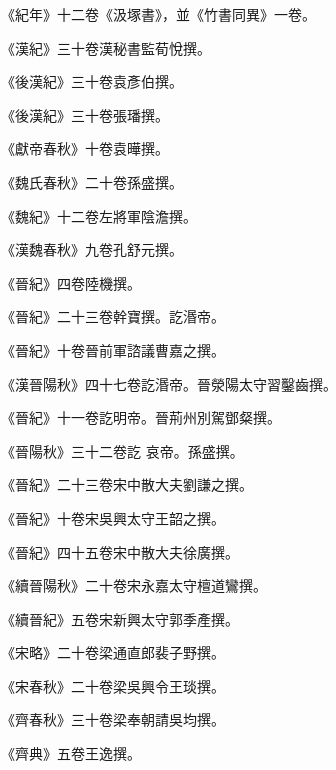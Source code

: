 \begin{pinyinscope}
 《紀年》十二卷《汲塚書》，並《竹書同異》一卷。



 《漢紀》三十卷漢秘書監荀悅撰。



 《後漢紀》三十卷袁彥伯撰。



 《後漢紀》三十卷張璠撰。



 《獻帝春秋》十卷袁曄撰。



 《魏氏春秋》二十卷孫盛撰。



 《魏紀》十二卷左將軍陰澹撰。



 《漢魏春秋》九卷孔舒元撰。



 《晉紀》四卷陸機撰。



 《晉紀》二十三卷幹寶撰。訖湣帝。



 《晉紀》十卷晉前軍諮議曹嘉之撰。



 《漢晉陽秋》四十七卷訖湣帝。晉滎陽太守習鑿齒撰。



 《晉紀》十一卷訖明帝。晉荊州別駕鄧粲撰。



 《晉陽秋》三十二卷訖
 哀帝。孫盛撰。



 《晉紀》二十三卷宋中散大夫劉謙之撰。



 《晉紀》十卷宋吳興太守王韶之撰。



 《晉紀》四十五卷宋中散大夫徐廣撰。



 《續晉陽秋》二十卷宋永嘉太守檀道鸞撰。



 《續晉紀》五卷宋新興太守郭季產撰。



 《宋略》二十卷梁通直郎裴子野撰。



 《宋春秋》二十卷梁吳興令王琰撰。



 《齊春秋》三十卷梁奉朝請吳均撰。



 《齊典》五卷王逸撰。




\end{pinyinscope}
